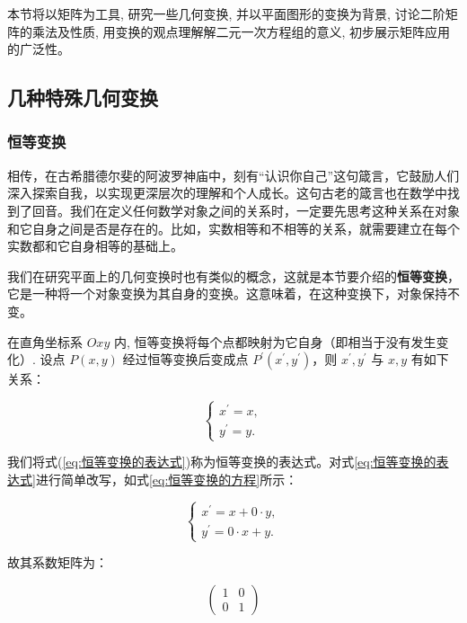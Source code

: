本节将以矩阵为工具, 研究一些几何变换, 并以平面图形的变换为背景, 讨论二阶矩阵的乘法及性质, 用变换的观点理解解二元一次方程组的意义, 初步展示矩阵应用的广泛性。

\subsection{几种特殊几何变换}
\label{subsec:几种特殊几何变换}

\subsubsection{恒等变换}
\label{subsubsec:恒等变换}

相传，在古希腊德尔斐的阿波罗神庙中，刻有“认识你自己”这句箴言，它鼓励人们深入探索自我，以实现更深层次的理解和个人成长。这句古老的箴言也在数学中找到了回音。我们在定义任何数学对象之间的关系时，一定要先思考这种关系在对象和它自身之间是否是存在的。比如，实数相等和不相等的关系，就需要建立在每个实数都和它自身相等的基础上。

我们在研究平面上的几何变换时也有类似的概念，这就是本节要介绍的\textcolor{third}{\bf 恒等变换}，它是一种将一个对象变换为其自身的变换。这意味着，在这种变换下，对象保持不变。

 在直角坐标系 $O x y$ 内, 恒等变换将每个点都映射为它自身（即相当于没有发生变化）. 设点 $P(x, y)$ 经过恒等变换后变成点 $P^{\prime}\left(x^{\prime}, y^{\prime}\right)$，则 $x^{\prime}, y^{\prime}$ 与 $x, y$ 有如下关系：

\begin{equation}
\left\{\begin{array}{l}
x^{\prime}=x, \\
y^{\prime}=y .
\end{array}\right.
\label{eq:恒等变换的表达式}
\end{equation}

我们将式(\ref{eq:恒等变换的表达式})称为恒等变换的表达式。对式\ref{eq:恒等变换的表达式}进行简单改写，如式\ref{eq:恒等变换的方程}所示：

\begin{equation}
\left\{\begin{array}{l}
x^{\prime}=x + 0\cdot y, \\
y^{\prime}= 0\cdot x + y .
\end{array}\right.
\label{eq:恒等变换的方程}
\end{equation}

故其系数矩阵为：

\begin{equation}
\left(\begin{array}{rr}
1  & 0 \\
0  & 1
\end{array}\right)
\label{eq:恒等变换矩阵}
\end{equation}

